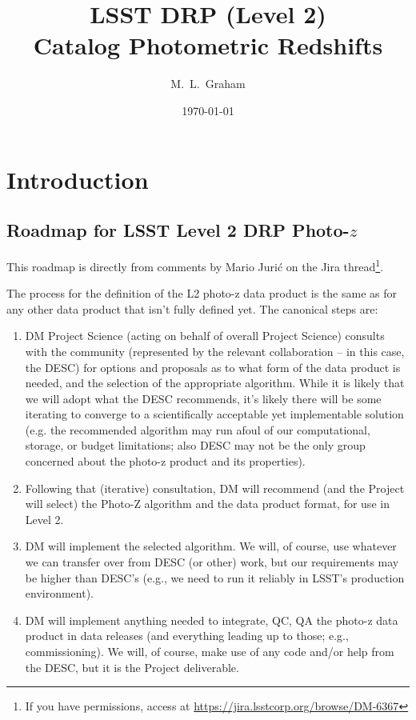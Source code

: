 \documentclass[DM,lsstdraft,toc]{lsstdoc}
\title[LSST Photo-$z$]{LSST DRP (Level 2) \\ Catalog Photometric Redshifts}
\author{M.~L.~Graham}
\date{\today}
\begin{document}
\maketitle




\section{Introduction} \label{sec:intro}

\subsection{Roadmap for LSST Level 2 DRP Photo-$z$}\label{ssec:intro_roadmap}

This roadmap is directly from comments by Mario Juri\'{c} on the Jira thread\footnote{If you have permissions, access at \url{https://jira.lsstcorp.org/browse/DM-6367}}.

The process for the definition of the L2 photo-z data product is the same as for any other data product that isn't fully defined yet. The canonical steps are:
\begin{enumerate}
\item DM Project Science (acting on behalf of overall Project Science) consults with the community (represented by the relevant collaboration -- in this case, the DESC) for options and proposals as to what form of the data product is needed, and the selection of the appropriate algorithm. While it is likely that we will adopt what the DESC recommends, it's likely there will be some iterating to converge to a scientifically acceptable yet implementable solution (e.g. the recommended algorithm may run afoul of our computational, storage, or budget limitations; also DESC may not be the only group concerned about the photo-z product and its properties).
\item Following that (iterative) consultation, DM will recommend (and the Project will select) the Photo-Z algorithm and the data product format, for use in Level 2.
\item DM will implement the selected algorithm. We will, of course, use whatever we can transfer over from DESC (or other) work, but our requirements may be higher than DESC's (e.g., we need to run it reliably in LSST's production environment).
\item DM will implement anything needed to integrate, QC, QA the photo-z data product in data releases (and everything leading up to those; e.g., commissioning). We will, of course, make use of any code and/or help from the DESC, but it is the Project deliverable.
\end{enumerate}
\end{document}
